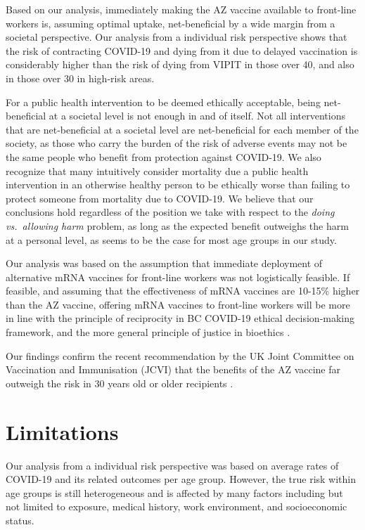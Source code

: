 \documentclass[]{interact}
\theoremstyle{plain}%
\theoremstyle{definition}
\theoremstyle{remark}
\begin{document}
Based on our analysis, immediately making the AZ vaccine available to
front-line workers is, assuming optimal uptake, net-beneficial by a wide
margin from a societal perspective. Our analysis from a individual risk
perspective shows that the risk of contracting COVID-19 and dying from
it due to delayed vaccination is considerably higher than the risk of
dying from VIPIT in those over 40, and also in those over 30 in
high-risk areas.

For a public health intervention to be deemed ethically acceptable,
being net-beneficial at a societal level is not enough in and of itself.
Not all interventions that are net-beneficial at a societal level are
net-beneficial for each member of the society, as those who carry the
burden of the risk of adverse events may not be the same people who
benefit from protection against COVID-19. We also recognize that many
intuitively consider mortality due a public health intervention in an
otherwise healthy person to be ethically worse than failing to protect
someone from mortality due to COVID-19. We believe that our conclusions
hold regardless of the position we take with respect to the \emph{doing
vs.~allowing harm} problem\citep{woollard_doing_2016}, as long as the
expected benefit outweighs the harm at a personal level, as seems to be
the case for most age groups in our study.

Our analysis was based on the assumption that immediate deployment of
alternative mRNA vaccines for front-line workers was not logistically
feasible. If feasible, and assuming that the effectiveness of mRNA
vaccines are 10-15\% higher than the AZ vaccine, offering mRNA vaccines
to front-line workers will be more in line with the principle of
reciprocity in BC COVID-19 ethical decision-making
framework\citep{bccdc_covid-19_2020}, and the more general principle of
justice in bioethics \citep{mccormick_principles_2021}.

Our findings confirm the recent recommendation by the UK Joint Committee
on Vaccination and Immunisation (JCVI) that the benefits of the AZ
vaccine far outweigh the risk in 30 years old or older recipients
\citep{jcvi_jcvi_2021}.

\hypertarget{limitations}{%
\section{Limitations}\label{limitations}}

Our analysis from a individual risk perspective was based on average
rates of COVID-19 and its related outcomes per age group. However, the
true risk within age groups is still heterogeneous and is affected by
many factors including but not limited to exposure, medical history,
work environment, and socioeconomic status.
\end{document}
